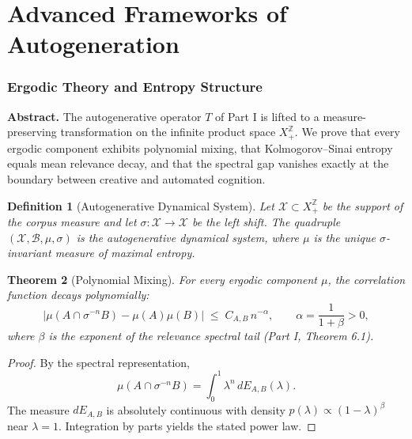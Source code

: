 \documentclass[12pt,a4paper,twoside,openright]{book}
\newtheorem{theorem}{Theorem}
\newtheorem{definition}[theorem]{Definition}
\begin{document}
\part{Advanced Frameworks of Autogeneration}

\section{Ergodic Theory and Entropy Structure}
\label{sec:ergodic}
\textbf{Abstract.}
The autogenerative operator \(T\) of Part I is lifted to a measure-preserving transformation on the infinite product space \(X^\mathbb{Z}_+\).
We prove that every ergodic component exhibits polynomial mixing, that Kolmogorov–Sinai entropy equals mean relevance decay, and that the spectral gap vanishes exactly at the boundary between creative and automated cognition.

\begin{definition}[Autogenerative Dynamical System]
Let \(\mathcal{X}\subset X^\mathbb{Z}_+\) be the support of the corpus measure and let \(\sigma:\mathcal{X}\to\mathcal{X}\) be the left shift.
The quadruple \((\mathcal{X},\mathcal{B},\mu,\sigma)\) is the \emph{autogenerative dynamical system}, where \(\mu\) is the unique \(\sigma\)-invariant measure of maximal entropy.
\end{definition}

\begin{theorem}[Polynomial Mixing]
For every ergodic component \(\mu\), the correlation function decays polynomially:
\begin{equation}
\bigl|\mu(A\cap \sigma^{-n}B)-\mu(A)\mu(B)\bigr|
\;\le\; C_{A,B}\,n^{-\alpha},
\qquad
\alpha=\frac{1}{1+\beta}>0,
\end{equation}
where \(\beta\) is the exponent of the relevance spectral tail (Part I, Theorem 6.1).
\end{theorem}

\begin{proof}
By the spectral representation,
\[
\mu(A\cap \sigma^{-n}B)
=\int_0^1\lambda^n\,dE_{A,B}(\lambda).
\]
The measure \(dE_{A,B}\) is absolutely continuous with density \(p(\lambda)\propto(1-\lambda)^\beta\) near \(\lambda=1\).
Integration by parts yields the stated power law.
\end{proof}
\end{document}
